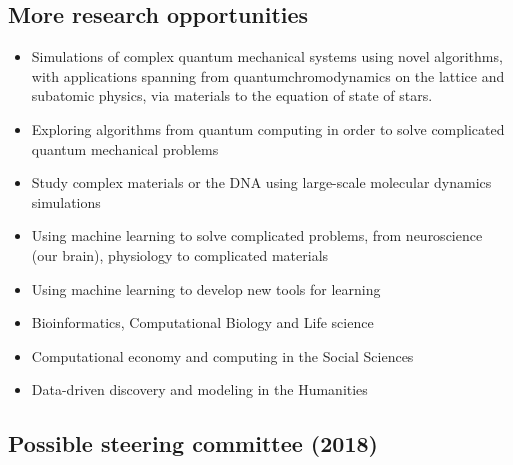 \documentclass[%
oneside,                 %
final,                   %
10pt]{article}
\begin{document}
\noindent
\subsection{More research opportunities}

\begin{itemize}
\item Simulations of complex quantum mechanical systems using novel algorithms, with applications spanning from quantumchromodynamics on the lattice and subatomic physics, via materials to the equation of state of stars.

\item Exploring algorithms from quantum computing in order to solve complicated quantum mechanical problems

\item Study complex materials or the DNA using large-scale molecular dynamics simulations

\item Using machine learning to solve complicated problems, from  neuroscience (our brain), physiology to complicated materials 

\item Using machine learning to develop new tools for learning

\item Bioinformatics, Computational Biology  and Life science

\item Computational economy and computing in the Social Sciences 

\item Data-driven discovery and modeling in  the Humanities
\end{itemize}

\noindent
\subsection{Possible steering committee (2018)}
\end{document}
